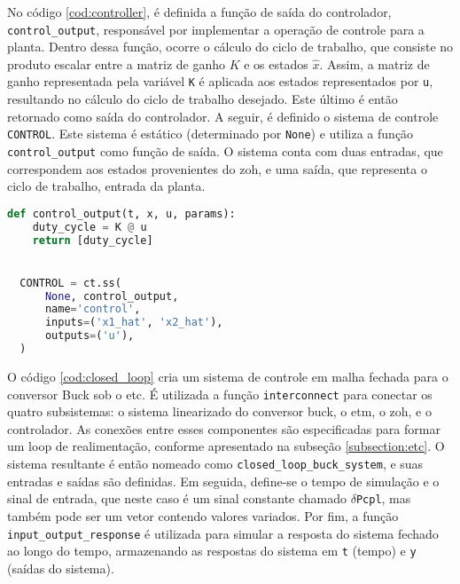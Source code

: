 No código \ref{cod:controller}, é definida a função de saída do controlador, \texttt{control\_output}, responsável por implementar a operação de controle para a planta. Dentro dessa função, ocorre o cálculo do ciclo de trabalho, que consiste no produto escalar entre a matriz de ganho $K$ e os estados $\hat{x}$. Assim, a matriz de ganho representada pela variável \texttt{K} é aplicada aos estados representados por \texttt{u}, resultando no cálculo do ciclo de trabalho desejado. Este último é então retornado como saída do controlador. A seguir, é definido o sistema de controle \texttt{CONTROL}. Este sistema é estático (determinado por \texttt{None}) e utiliza a função \texttt{control\_output} como função de saída. O sistema conta com duas entradas, que correspondem aos estados provenientes do \acrshort{zoh}, e uma saída, que representa o ciclo de trabalho, entrada da planta.

\vspace{8pt}
\begin{lstlisting}[language=Python, caption={Implementação do controlador.}, label=cod:controller]
  def control_output(t, x, u, params):
    duty_cycle = K @ u
    return [duty_cycle]


  CONTROL = ct.ss(
      None, control_output,
      name='control',
      inputs=('x1_hat', 'x2_hat'),
      outputs=('u'),
  )
\end{lstlisting}

O código \ref{cod:closed_loop} cria um sistema de controle em malha fechada para o conversor Buck sob o \acrshort{etc}. É utilizada a função \texttt{interconnect} para conectar os quatro subsistemas: o sistema linearizado do conversor buck, o \acrshort{etm}, o \acrshort{zoh}, e o controlador. As conexões entre esses componentes são especificadas para formar um loop de realimentação, conforme apresentado na subseção \ref{subsection:etc}. O sistema resultante é então nomeado como \texttt{closed\_loop\_buck\_system}, e suas entradas e saídas são definidas. Em seguida, define-se o tempo de simulação e o sinal de entrada, que neste caso é um sinal constante chamado \texttt{\ensuremath{\delta}Pcpl}, mas também pode ser um vetor contendo valores variados. Por fim, a função \texttt{input\_output\_response} é utilizada para simular a resposta do sistema fechado ao longo do tempo, armazenando as respostas do sistema em \texttt{t} (tempo) e \texttt{y} (saídas do sistema).


